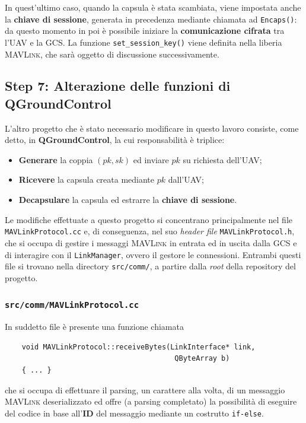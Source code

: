 \documentclass[a4paper, 12pt, oneside]{article}
\theoremstyle{definition}
\begin{document}
In quest'ultimo caso, quando la capsula è stata scambiata, viene impostata anche la \textbf{chiave di sessione}, generata in precedenza mediante chiamata ad \texttt{Encaps()}: da questo momento in poi è possibile iniziare la \textbf{comunicazione cifrata} tra l'UAV e la GCS.
La funzione \texttt{set\_session\_key()} viene definita nella liberia \textsc{MAVLink}, che sarà oggetto di discussione successivamente.

\newpage
\subsection{Step 7: Alterazione delle funzioni di \textbf{QGroundControl}}
L'altro progetto che è stato necessario modificare in questo lavoro consiste, come detto, in \textbf{QGroundControl}, la cui responsabilità è triplice:

\begin{itemize}
    \item \textbf{Generare} la coppia $(pk, sk)$ ed inviare $pk$ su richiesta dell'UAV;
    \item \textbf{Ricevere} la capsula creata mediante $pk$ dall'UAV;
    \item \textbf{Decapsulare} la capsula ed estrarre la \textbf{chiave di sessione}.
\end{itemize}

Le modifiche effettuate a questo progetto si concentrano principalmente nel file \texttt{MAVLinkProtocol.cc} e, di conseguenza, nel suo \textit{header file} \texttt{MAVLinkProtocol.h}, che si occupa di gestire i messaggi \textsc{MAVLink} in entrata ed in uscita dalla GCS e di interagire con il \texttt{LinkManager}, ovvero il gestore le connessioni. Entrambi questi file si trovano nella directory \texttt{src/comm/}, a partire dalla \textit{root} della repository del progetto.

\subsubsection{\texttt{src/comm/MAVLinkProtocol.cc}}
In suddetto file è presente una funzione chiamata
\begin{verbatim}
    void MAVLinkProtocol::receiveBytes(LinkInterface* link, 
                                        QByteArray b)
    { ... }
\end{verbatim}

che si occupa di effettuare il parsing, un carattere alla volta, di un messaggio \textsc{MAVLink} deserializzato ed offre (a parsing completato) la possibilità di eseguire del codice in base all'\textbf{ID} del messaggio mediante un costrutto \texttt{if-else}.
\end{document}
